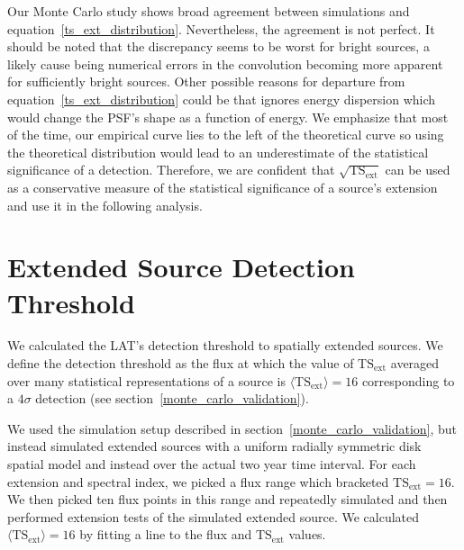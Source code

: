\documentclass[12pt,preprint]{aastex}
\newcommand{\tsext}{{\ensuremath{\text{TS}_{\text{ext}}}}\xspace}
\newcommand{\pointlike}{\text{\em pointlike}\xspace}
\begin{document}
Our Monte Carlo study shows broad agreement between simulations and
equation~\ref{ts_ext_distribution}. Nevertheless, the agreement is not
perfect.  It should be noted that the discrepancy seems to be worst for
bright sources, a likely cause being numerical errors in the convolution
becoming more apparent for sufficiently bright sources.  Other possible
reasons for departure from equation~\ref{ts_ext_distribution} could
be that \pointlike ignores energy dispersion which would change the
PSF's shape as a function of energy. We emphasize that most of the
time, our empirical curve lies to the left of the theoretical curve so
using the theoretical distribution would lead to an underestimate of the
statistical significance of a detection. Therefore, we are confident that
$\sqrt{\tsext}$ can be used as a conservative measure of the statistical
significance of a source's extension and use it in the following analysis.

\section{Extended Source Detection Threshold}\label{extension_sensitivity}

We calculated the LAT's detection threshold to spatially extended
sources. We define the detection threshold as the flux at which the value
of $\tsext$ averaged over many statistical representations of a source
is $\langle\tsext\rangle=16$ corresponding to a $4\sigma$ detection
(see section~\ref{monte_carlo_validation}).

We used the simulation setup described in
section~\ref{monte_carlo_validation}, but instead simulated extended
sources with a uniform radially symmetric disk spatial model and
instead over the actual two year time interval.  For each extension and
spectral index, we picked a flux range which bracketed $\tsext=16$. We
then picked ten flux points in this range and repeatedly simulated
and then performed extension tests of the simulated extended source.
We calculated $\langle\tsext\rangle=16$ by fitting a line to the flux
and $\tsext$ values.
\end{document}
